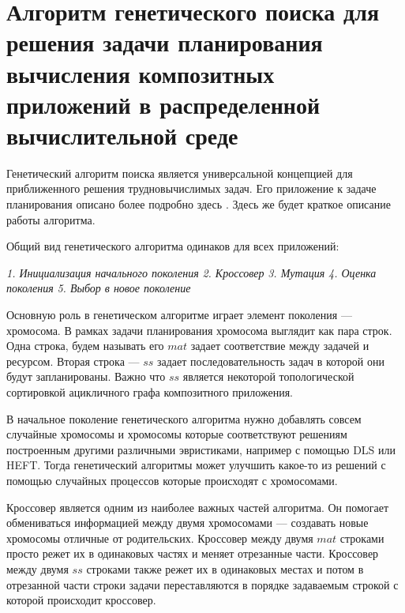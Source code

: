 \chapter*{Алгоритм генетического поиска для решения задачи планирования вычисления композитных приложений в распределенной вычислительной среде}
\begin{spacing}{1.3}

Генетический алгоритм поиска является универсальной концепцией для приближенного решения трудновычислимых задач. Его приложение к задаче планирования описано более подробно здесь \cite{GA}. Здесь же будет краткое описание работы алгоритма.

Общий вид генетического алгоритма одинаков для всех приложений:

\begin{algorithmic}
\STATE \textit{1. Инициализация начального поколения}
    	\STATE \textit{2. Кроссовер} 
    	\STATE \textit{3. Мутация}
    	\STATE \textit{4. Оценка поколения}
    	\STATE \textit{5. Выбор в новое поколение}
    \ENDWHILE
\end{algorithmic}

Основную роль в генетическом алгоритме играет элемент поколения --- хромосома. В рамках задачи планирования хромосома выглядит как пара строк. Одна строка, будем называть его $mat$ задает соответствие между задачей и ресурсом. Вторая строка --- $ss$ задает последовательность задач в которой они будут запланированы. Важно что $ss$ является некоторой топологической сортировкой ацикличного графа композитного приложения.

В начальное поколение генетического алгоритма нужно добавлять совсем случайные хромосомы и хромосомы которые соответствуют решениям построенным другими различными эвристиками, например с помощью DLS или HEFT. Тогда генетический алгоритмы может улучшить какое-то из решений с помощью случайных процессов которые происходят с хромосомами. 


Кроссовер является одним из наиболее важных частей алгоритма. Он помогает обмениваться информацией между двумя хромосомами --- создавать новые хромосомы отличные от родительских. Кроссовер между двумя $mat$ строками просто режет их в одинаковых частях и меняет отрезанные части. Кроссовер между двумя $ss$  строками также режет их в одинаковых местах и потом в отрезанной части строки задачи переставляются в порядке задаваемым строкой с которой происходит кроссовер. 


\end{spacing}
